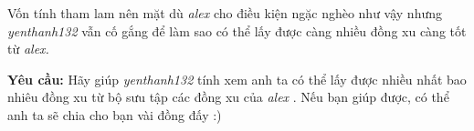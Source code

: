    Vốn tính tham lam nên mặt dù   \emph{    alex   }   cho điều kiện ngặc nghèo như vậy nhưng   \emph{    yenthanh132   }   vẫn cố gắng để làm sao có thể lấy được càng nhiều đồng xu càng tốt từ   \emph{    alex.   }

\textbf{    Yêu cầu:   }   Hãy giúp   \emph{    yenthanh132   }   tính xem anh ta có thể lấy được nhiều nhất bao nhiêu đồng xu từ bộ sưu tập các đồng xu của   \emph{    alex   }   . Nếu bạn giúp được, có thể anh ta sẽ chia cho bạn vài đồng đấy :)